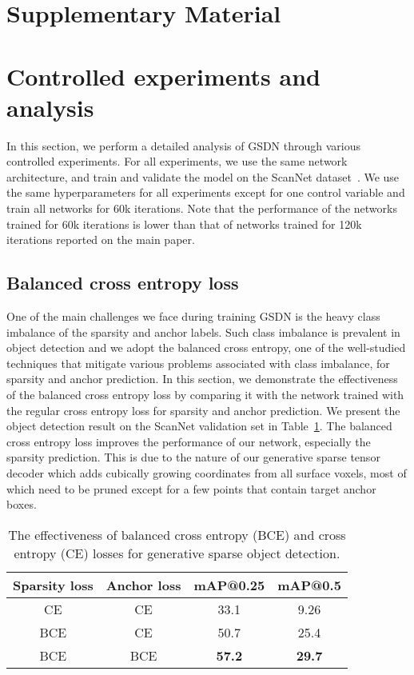 \documentclass[runningheads]{llncs}
\begin{document}
\nocite{tange2011gnu}



\newpage
\section*{Supplementary Material}
\setcounter{section}{0}
\renewcommand\thesection{S.\arabic{section}}

\section{Controlled experiments and analysis}

In this section, we perform a detailed analysis of GSDN through various controlled experiments. For all experiments, we use the same network architecture, and train and validate the model on the ScanNet dataset~\cite{dai2017scannet}. We use the same hyperparameters for all experiments except for one control variable and train all networks for 60k iterations. Note that the performance of the networks trained for 60k iterations is lower than that of networks trained for 120k iterations reported on the main paper.

\subsection{Balanced cross entropy loss}

One of the main challenges we face during training GSDN is the heavy class imbalance of the sparsity and anchor labels. Such class imbalance is prevalent in object detection and we adopt the balanced cross entropy, one of the well-studied techniques that mitigate various problems associated with class imbalance, for sparsity and anchor prediction. In this section, we demonstrate the effectiveness of the balanced cross entropy loss by comparing it with the network trained with the regular cross entropy loss for sparsity and anchor prediction. We present the object detection result on the ScanNet validation set in Table~\ref{tab:balanced}. The balanced cross entropy loss improves the performance of our network, especially the sparsity prediction. This is due to the nature of our generative sparse tensor decoder which adds cubically growing coordinates from all surface voxels, most of which need to be pruned except for a few points that contain target anchor boxes.

\begin{table}[]
    \centering
    \begin{tabular}{c|c||cc}
    \toprule
    Sparsity loss & Anchor loss & mAP@0.25 & mAP@0.5 \\ \midrule
    CE  & CE  & 33.1 &  9.26  \\
    BCE & CE  &  50.7 & 25.4  \\ \midrule
    BCE & BCE &   \textbf{57.2}   &   \textbf{29.7}  \\ \bottomrule
    \end{tabular}
    \vspace{1em}
    \caption{The effectiveness of balanced cross entropy (BCE) and cross entropy (CE) losses for generative sparse object detection.}
    \label{tab:balanced}
\end{table}
\end{document}
